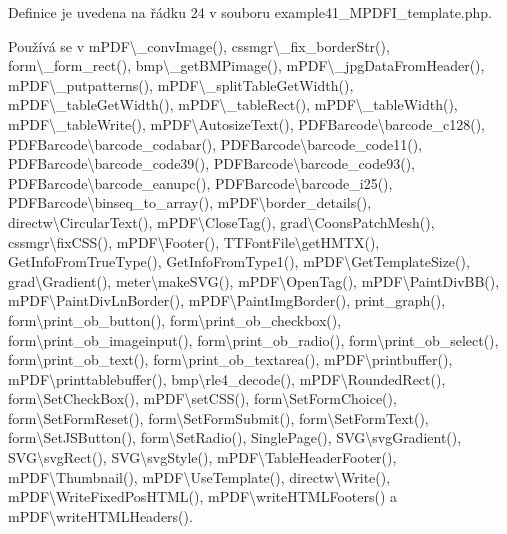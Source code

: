 Definice je uvedena na řádku 24 v souboru example41\-\_\-\-M\-P\-D\-F\-I\-\_\-template.\-php.



Používá se v m\-P\-D\-F\textbackslash{}\-\_\-conv\-Image(), cssmgr\textbackslash{}\-\_\-fix\-\_\-border\-Str(), form\textbackslash{}\-\_\-form\-\_\-rect(), bmp\textbackslash{}\-\_\-get\-B\-M\-Pimage(), m\-P\-D\-F\textbackslash{}\-\_\-jpg\-Data\-From\-Header(), m\-P\-D\-F\textbackslash{}\-\_\-putpatterns(), m\-P\-D\-F\textbackslash{}\-\_\-split\-Table\-Get\-Width(), m\-P\-D\-F\textbackslash{}\-\_\-table\-Get\-Width(), m\-P\-D\-F\textbackslash{}\-\_\-table\-Rect(), m\-P\-D\-F\textbackslash{}\-\_\-table\-Width(), m\-P\-D\-F\textbackslash{}\-\_\-table\-Write(), m\-P\-D\-F\textbackslash{}\-Autosize\-Text(), P\-D\-F\-Barcode\textbackslash{}barcode\-\_\-c128(), P\-D\-F\-Barcode\textbackslash{}barcode\-\_\-codabar(), P\-D\-F\-Barcode\textbackslash{}barcode\-\_\-code11(), P\-D\-F\-Barcode\textbackslash{}barcode\-\_\-code39(), P\-D\-F\-Barcode\textbackslash{}barcode\-\_\-code93(), P\-D\-F\-Barcode\textbackslash{}barcode\-\_\-eanupc(), P\-D\-F\-Barcode\textbackslash{}barcode\-\_\-i25(), P\-D\-F\-Barcode\textbackslash{}binseq\-\_\-to\-\_\-array(), m\-P\-D\-F\textbackslash{}border\-\_\-details(), directw\textbackslash{}\-Circular\-Text(), m\-P\-D\-F\textbackslash{}\-Close\-Tag(), grad\textbackslash{}\-Coons\-Patch\-Mesh(), cssmgr\textbackslash{}fix\-C\-S\-S(), m\-P\-D\-F\textbackslash{}\-Footer(), T\-T\-Font\-File\textbackslash{}get\-H\-M\-T\-X(), Get\-Info\-From\-True\-Type(), Get\-Info\-From\-Type1(), m\-P\-D\-F\textbackslash{}\-Get\-Template\-Size(), grad\textbackslash{}\-Gradient(), meter\textbackslash{}make\-S\-V\-G(), m\-P\-D\-F\textbackslash{}\-Open\-Tag(), m\-P\-D\-F\textbackslash{}\-Paint\-Div\-B\-B(), m\-P\-D\-F\textbackslash{}\-Paint\-Div\-Ln\-Border(), m\-P\-D\-F\textbackslash{}\-Paint\-Img\-Border(), print\-\_\-graph(), form\textbackslash{}print\-\_\-ob\-\_\-button(), form\textbackslash{}print\-\_\-ob\-\_\-checkbox(), form\textbackslash{}print\-\_\-ob\-\_\-imageinput(), form\textbackslash{}print\-\_\-ob\-\_\-radio(), form\textbackslash{}print\-\_\-ob\-\_\-select(), form\textbackslash{}print\-\_\-ob\-\_\-text(), form\textbackslash{}print\-\_\-ob\-\_\-textarea(), m\-P\-D\-F\textbackslash{}printbuffer(), m\-P\-D\-F\textbackslash{}printtablebuffer(), bmp\textbackslash{}rle4\-\_\-decode(), m\-P\-D\-F\textbackslash{}\-Rounded\-Rect(), form\textbackslash{}\-Set\-Check\-Box(), m\-P\-D\-F\textbackslash{}set\-C\-S\-S(), form\textbackslash{}\-Set\-Form\-Choice(), form\textbackslash{}\-Set\-Form\-Reset(), form\textbackslash{}\-Set\-Form\-Submit(), form\textbackslash{}\-Set\-Form\-Text(), form\textbackslash{}\-Set\-J\-S\-Button(), form\textbackslash{}\-Set\-Radio(), Single\-Page(), S\-V\-G\textbackslash{}svg\-Gradient(), S\-V\-G\textbackslash{}svg\-Rect(), S\-V\-G\textbackslash{}svg\-Style(), m\-P\-D\-F\textbackslash{}\-Table\-Header\-Footer(), m\-P\-D\-F\textbackslash{}\-Thumbnail(), m\-P\-D\-F\textbackslash{}\-Use\-Template(), directw\textbackslash{}\-Write(), m\-P\-D\-F\textbackslash{}\-Write\-Fixed\-Pos\-H\-T\-M\-L(), m\-P\-D\-F\textbackslash{}write\-H\-T\-M\-L\-Footers() a m\-P\-D\-F\textbackslash{}write\-H\-T\-M\-L\-Headers().

